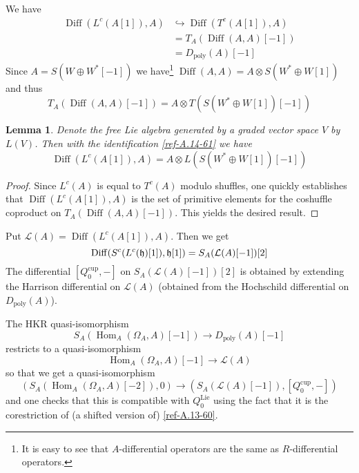 \documentclass{amsart}
\numberwithin{equation}{section}
\let\cal\mathcal
\newtheorem{lemmas}{Lemma}[subsection]
\theoremstyle{definition}
\theoremstyle{remark}
\begin{document}
\medskip

We have
\begin{align*}
{\operatorname{Diff}}(L^{c}(A[1]),A)&\hookrightarrow {\operatorname{Diff}}(T^{c}(A[1]),A)\\
&=T_A({\operatorname{Diff}}(A,A)[-1])\\
&=D_{\operatorname{poly}}(A)[-1]
\end{align*}
Since $A=S(W\oplus W^\ast[-1])$ we have\footnote{It is easy to see
  that $A$-differential operators are the same as
  $R$-differential operators.} ${\operatorname{Diff}}(A,A)=A\otimes S(W^\ast\oplus
W[1])$ and thus
\begin{equation}
\label{ref-A.14-61}
T_A({\operatorname{Diff}}(A,A)[-1])=A\otimes T(S(W^\ast\oplus W[1])[-1])
\end{equation}
\begin{lemmas} 
\label{ref-A.5.2-62} Denote the free Lie algebra generated by a graded vector
  space $V$ by $L(V)$. Then with the identification
  \eqref{ref-A.14-61} we have
\[
{\operatorname{Diff}}(L^{c}(A[1]),A)=A\otimes L(S(W^\ast\oplus W[1])[-1])
\]
\end{lemmas}
\begin{proof}
Since $L^c(A)$ is equal to $T^c(A)$ modulo shuffles, one 
quickly establishes that ${\operatorname{Diff}}(L^{c}(A[1]),A)$ is the set of primitive
elements for the coshuffle coproduct on $T_A({\operatorname{Diff}}(A,A)[-1])$. 
This yields the desired result.
\end{proof}
Put ${{\cal L}}(A)={\operatorname{Diff}}(L^{c}(A[1]),A)$. Then we get
\begin{equation}
\label{ref-A.15-63}
{\operatorname{Diff}}(S^c(L^{c}(\frak{h})[1]),\frak{h}[1])=S_A({{\cal L}}(A)[-1])[2]
\end{equation}
The differential $[Q_0^{\operatorname{cup}},-]$ on $S_A({{\cal L}}(A)[-1])[2]$ is obtained
by extending the Harrison differential on ${{\cal L}}(A)$ (obtained
from the Hochschild differential on $D_{\operatorname{poly}}(A)$). 

The HKR quasi-isomorphism
\[
S_A({\operatorname {Hom}}_A(\Omega_A,A)[-1])\rightarrow D_{\operatorname{poly}}(A)[-1]
\]
restricts to a quasi-isomorphism
\[
{\operatorname {Hom}}_A(\Omega_A,A)[-1]\rightarrow {{\cal L}}(A)
\]
so that we get a quasi-isomorphism
\[
(S_A({\operatorname {Hom}}_A(\Omega_A,A)[-2]),0)\rightarrow (S_A({{\cal L}}(A)[-1]),[Q_0^{\operatorname{cup}},-])
\]
and one checks that this is compatible with $Q_0^{\operatorname{Lie}}$ using the fact
that it is the corestriction of (a shifted version of) \eqref{ref-A.13-60}.
\end{document}
